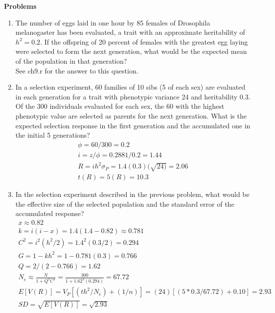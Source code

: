 \documentclass[12pt]{amsart}
\begin{document}
{\large \bf Problems}   
\begin{enumerate}
\item The number of eggs laid in one hour by 85 females of Drosophila melanogaster has been evaluated, a trait with an approximate heritability of $h^2 = 0.2$. If the offspring of 20 percent of females with the greatest egg laying were selected to form the next generation, what would be the expected mean of the population in that generation?\\
See ch9.r for the answer to this question.\\

\item In a selection experiment, 60 families of 10 sibs (5 of each sex) are evaluated in each generation for a trait with phenotypic variance 24 and heritability 0.3. Of the 300 individuals evaluated for each sex, the 60 with the highest phenotypic value are selected as parents for the next generation. What is the expected selection response in the first generation and the accumulated one in the initial 5 generations?\\
\begin{gather*}
\phi = 60/300 = 0.2\\
i = z/\phi = 0.2881/0.2 = 1.44\\
R = ih^2\sigma_P = 1.4(0.3)(\sqrt{24)} = 2.06\\
t(R) = 5(R) = 10.3
\end{gather*}

\item In the selection experiment described in the previous problem, what would be the effective size of the selected population and the standard error of the accumulated response?
\begin{gather*}
x \approx 0.82\\
k = i(i-x) = 1.4(1.4-0.82) \approx 0.781 \\
C^2 = i^2(h^2/2) = 1.4^2(0.3/2) = 0.294\\ 
G = 1-kh^2 = 1-0.781(0.3) = 0.766\\
Q = 2/(2-0.766) =  1.62\\
N_e \approx \frac{N}{1 + Q^2C^2} = \frac{300}{1 +1.62^2(0.294) } = 67.72\\
E[V(R)] = V_P[(th^2/N_e) + (1/n)] = (24)[(5*0.3/67.72) + 0.10] = 2.93\\
SD = \sqrt{E[V(R)]} = \sqrt{2.93}
\end{gather*}


\end{enumerate}
\end{document}
